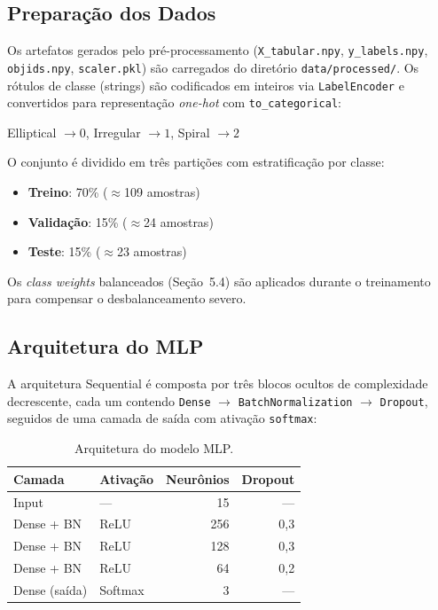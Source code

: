\documentclass[12pt, a4paper]{article}
\begin{document}
\subsection{Preparação dos Dados}

Os artefatos gerados pelo pré-processamento (\texttt{X\_tabular.npy},
\texttt{y\_labels.npy}, \texttt{objids.npy}, \texttt{scaler.pkl}) são
carregados do diretório \texttt{data/processed/}. Os rótulos de classe
(strings) são codificados em inteiros via \texttt{LabelEncoder} e
convertidos para representação \textit{one-hot} com
\texttt{to\_categorical}:

\begin{center}
  Elliptical $\to 0$, \quad Irregular $\to 1$, \quad Spiral $\to 2$
\end{center}

O conjunto é dividido em três partições com estratificação por classe:
\begin{itemize}[leftmargin=2em]
  \item \textbf{Treino}: 70\% ($\approx$109 amostras)
  \item \textbf{Validação}: 15\% ($\approx$24 amostras)
  \item \textbf{Teste}: 15\% ($\approx$23 amostras)
\end{itemize}

Os \textit{class weights} balanceados (Seção~5.4) são aplicados durante
o treinamento para compensar o desbalanceamento severo.

\subsection{Arquitetura do MLP}

A arquitetura Sequential é composta por três blocos ocultos de complexidade
decrescente, cada um contendo \texttt{Dense} $\to$ \texttt{BatchNormalization}
$\to$ \texttt{Dropout}, seguidos de uma camada de saída com ativação
\texttt{softmax}:

\begin{table}[H]
  \centering
  \caption{Arquitetura do modelo MLP.}
  \label{tab:mlp_arch}
  \begin{tabular}{llrr}
    \toprule
    \textbf{Camada} & \textbf{Ativação} & \textbf{Neurônios} & \textbf{Dropout} \\
    \midrule
    Input           & ---       & 15  & --- \\
    Dense + BN      & ReLU      & 256 & 0,3 \\
    Dense + BN      & ReLU      & 128 & 0,3 \\
    Dense + BN      & ReLU      & 64  & 0,2 \\
    Dense (saída)   & Softmax   & 3   & --- \\
    \bottomrule
  \end{tabular}
\end{table}
\end{document}
